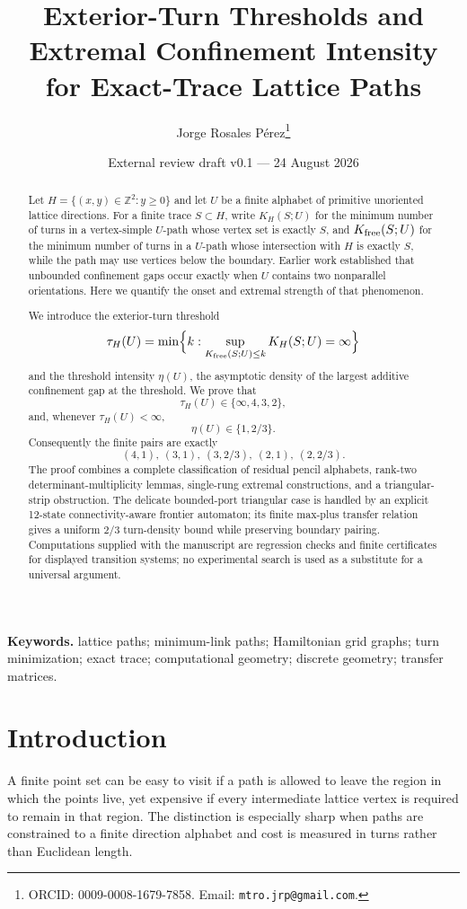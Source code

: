 \documentclass[11pt]{article}
\title{\textbf{Exterior-Turn Thresholds and Extremal Confinement Intensity\\for Exact-Trace Lattice Paths}}
\author[1]{Jorge Rosales P\'erez\thanks{ORCID: 0009-0008-1679-7858. Email: \texttt{mtro.jrp@gmail.com}.}}
\affil[1]{Independent Researcher, Mexico}
\date{External review draft v0.1 --- 24 August 2026}
\theoremstyle{definition}
\newcommand{\Z}{\mathbb Z}
\begin{document}
\maketitle

\begin{abstract}
Let $H=\{(x,y)\in\Z^2:y\ge0\}$ and let $U$ be a finite alphabet of primitive unoriented lattice directions.  For a finite trace $S\subset H$, write $K_H(S;U)$ for the minimum number of turns in a vertex-simple $U$-path whose vertex set is exactly $S$, and $K_{\rm free}(S;U)$ for the minimum number of turns in a $U$-path whose intersection with $H$ is exactly $S$, while the path may use vertices below the boundary.  Earlier work established that unbounded confinement gaps occur exactly when $U$ contains two nonparallel orientations.  Here we quantify the onset and extremal strength of that phenomenon.

We introduce the exterior-turn threshold
\[
\tau_H(U)=\min\Bigl\{k:\sup_{K_{\rm free}(S;U)\le k}K_H(S;U)=\infty\Bigr\}
\]
and the threshold intensity $\eta(U)$, the asymptotic density of the largest additive confinement gap at the threshold.  We prove that
\[
\tau_H(U)\in\{\infty,4,3,2\},
\]
and, whenever $\tau_H(U)<\infty$,
\[
\eta(U)\in\{1,2/3\}.
\]
Consequently the finite pairs are exactly
\[
(4,1),\ (3,1),\ (3,2/3),\ (2,1),\ (2,2/3).
\]
The proof combines a complete classification of residual pencil alphabets, rank-two determinant-multiplicity lemmas, single-rung extremal constructions, and a triangular-strip obstruction.  The delicate bounded-port triangular case is handled by an explicit 12-state connectivity-aware frontier automaton; its finite max-plus transfer relation gives a uniform $2/3$ turn-density bound while preserving boundary pairing.  Computations supplied with the manuscript are regression checks and finite certificates for displayed transition systems; no experimental search is used as a substitute for a universal argument.
\end{abstract}

\medskip
\noindent\textbf{Keywords.} lattice paths; minimum-link paths; Hamiltonian grid graphs; turn minimization; exact trace; computational geometry; discrete geometry; transfer matrices.

\section{Introduction}
A finite point set can be easy to visit if a path is allowed to leave the region in which the points live, yet expensive if every intermediate lattice vertex is required to remain in that region.  The distinction is especially sharp when paths are constrained to a finite direction alphabet and cost is measured in turns rather than Euclidean length.
\end{document}

